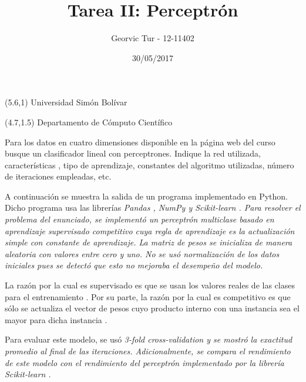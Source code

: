 \documentclass[11pt,spanish,answers]{exam}
\title{Tarea II: Perceptrón}
\author{Georvic Tur - 12-11402}
\date{30/05/2017}
\begin{document}
\begin{textblock}{10}(5.6,1)
    \noindent\LARGE Universidad Simón Bolívar
\end{textblock}

\begin{textblock}{10}(4.7,1.5)
    \noindent\LARGE Departamento de Cómputo Científico
\end{textblock}

\maketitle

\renewcommand{\solutiontitle}{\noindent\textbf{Solución:}\par\noindent}

\begin{questions}

\question
Para los datos en cuatro dimensiones disponible en la página web del curso busque un clasificador lineal con perceptrones. Indique la red utilizada, características , tipo de
aprendizaje, constantes del algoritmo utilizadas, número de iteraciones empleadas, etc.

    \begin{solution}
    
A continuación se muestra la salida de un programa implementado en Python. Dicho programa usa las librerías \em Pandas \em, \em NumPy \em y \em Scikit-learn \em. Para resolver el problema del enunciado, se implementó un perceptrón multiclase basado en aprendizaje supervisado competitivo cuya regla de aprendizaje es la actualización simple con constante de aprendizaje. La matriz de pesos se inicializa de manera aleatoria con valores entre cero y uno. No se usó normalización de los datos iniciales pues se detectó que esto no mejoraba el desempeño del modelo.

La razón por la cual es supervisado es que se usan los valores reales de las clases para el entrenamiento \cite{aprendizajeSupervisado}. Por su parte, la razón por la cual es competitivo es que sólo se actualiza el vector de pesos cuyo producto interno con una instancia sea el mayor para dicha instancia \cite{perceptronCompetitivo}.

Para evaluar este modelo, se usó \em 3-fold cross-validation \em y se mostró la exactitud promedio al final de las iteraciones. Adicionalmente, se compara el rendimiento de este modelo con el rendimiento del perceptrón implementado por la librería \em Scikit-learn \em.


\end{solution}
\end{questions}
\end{document}
